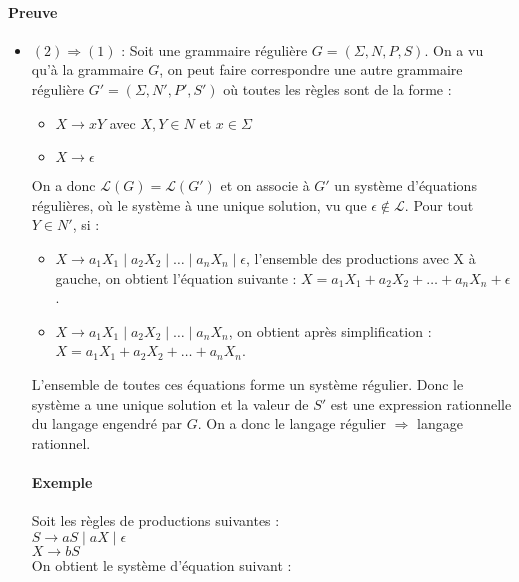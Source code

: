 

\paragraph{Preuve} %
\label{par:preuve}

\begin{itemize}
	\item $(2) \Rightarrow (1)$ : Soit une grammaire régulière $G=(\Sigma,N,P,S)$. On a vu qu'à la grammaire $G$, on peut faire correspondre une autre grammaire régulière $G'=(\Sigma,N',P',S')$ où toutes les règles sont de la forme :
	\begin{itemize}
		\item $X \rightarrow xY$ avec $X,Y \in N$ et $x \in \Sigma$
		\item $X \rightarrow \epsilon$\\
	\end{itemize}

	On a donc $\mathcal{L}(G) = \mathcal{L}(G')$ et on associe à $G'$ un système d'équations régulières, où le système à une unique solution, vu que $\epsilon \not \in \mathcal{L}$. Pour tout $Y \in N'$, si :
	\begin{itemize}
		\item $X \rightarrow a_1X_1 \mid a_2X_2 \mid \ldots \mid a_nX_n \mid \epsilon$, l'ensemble des productions avec X à gauche, on obtient l'équation suivante : $X = a_1X_1 + a_2X_2 + \ldots + a_nX_n + \epsilon$.
		\item $X \rightarrow a_1X_1 \mid a_2X_2 \mid \ldots \mid a_nX_n$, on obtient après simplification : $X = a_1X_1 + a_2X_2 + \ldots + a_nX_n$.\\
	\end{itemize}
	L'ensemble de toutes ces équations forme un système régulier. Donc le système a une unique solution et la valeur de $S'$ est une expression rationnelle du langage engendré par $G$. On a donc le langage régulier $\Rightarrow$ langage rationnel.

	\paragraph{Exemple} %
	\label{par:exemple}
	Soit les règles de productions suivantes :\\
	$S \rightarrow aS \mid aX \mid \epsilon$\\
	$X \rightarrow bS$\\
	On obtient le système d'équation suivant :\\


\end{itemize}
